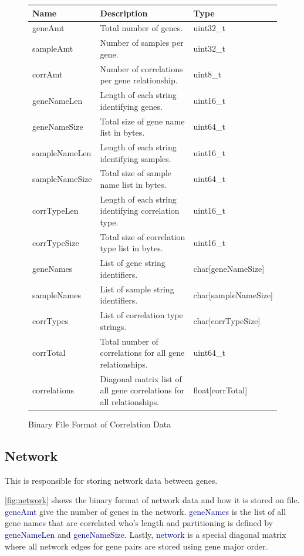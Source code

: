 \documentclass[10pt]{article}
\providecommand{\h}[1]{\textcolor{darkblue}{#1}}
\begin{document}
\begin{appendices}
\begin{figure}[H]
\begin{mdframed}[style=btable]
\begin{tabularx}{\textwidth}{|l|X|l|}
\hline
\textbf{Name} & \textbf{Description} & \textbf{Type} \\
\hline
geneAmt & Total number of genes. & uint32\_t \\
\hline
sampleAmt & Number of samples per gene. & uint32\_t \\
\hline
corrAmt & Number of correlations per gene relationship. & uint8\_t \\
\hline
geneNameLen & Length of each string identifying genes. & uint16\_t \\
\hline
geneNameSize & Total size of gene name list in bytes. & uint64\_t \\
\hline
sampleNameLen & Length of each string identifying samples. & uint16\_t \\
\hline
sampleNameSize & Total size of sample name list in bytes. & uint64\_t \\
\hline
corrTypeLen & Length of each string identifying correlation type. & uint16\_t \\
\hline
corrTypeSize & Total size of correlation type list in bytes. & uint16\_t \\
\hline
geneNames & List of gene string identifiers. & char[geneNameSize] \\
\hline
sampleNames & List of sample string identifiers. & char[sampleNameSize] \\
\hline
corrTypes & List of correlation type strings. & char[corrTypeSize] \\
\hline
corrTotal & Total number of correlations for all gene relationships. & 
uint64\_t \\
\hline
correlations & Diagonal matrix list of all gene correlations for all 
relationships. & float[corrTotal] \\
\hline
\end{tabularx}
\end{mdframed}
\caption{Binary File Format of Correlation Data}
\label{fig:correlation}
\end{figure}

\subsection{Network}

This is responsible for storing network data between genes.

\autoref{fig:network} shows the binary format of network data and how it is 
stored on file. \h{geneAmt} give the number of genes in the network. 
\h{geneNames} is the list of all gene names that are correlated who's length 
and 
partitioning is defined by \h{geneNameLen} and \h{geneNameSize}. Lastly, 
\h{network} is a special diagonal matrix where all network edges for gene pairs 
are stored using gene major order.


\end{appendices}
\end{document}
